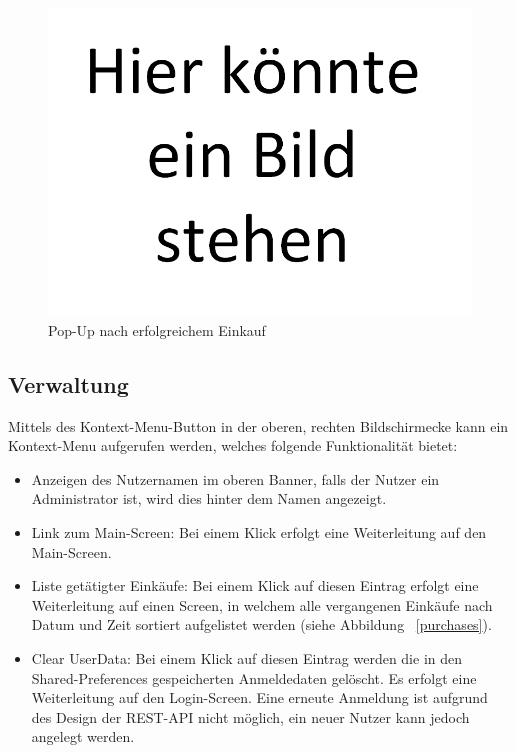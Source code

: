 \documentclass{scrartcl}
\begin{document}
	\begin{figure}[!h]
		\centering
		\includegraphics[scale=0.5]{./figures/placeholder.png}
		\caption{Pop-Up nach erfolgreichem Einkauf}
		\label{purchaseSuccess}
	\end{figure}

	\subsection{Verwaltung}\label{subsec:verwaltung}

	Mittels des Kontext-Menu-Button in der oberen, rechten Bildschirmecke kann ein Kontext-Menu aufgerufen werden, welches folgende Funktionalität bietet:

	\begin{itemize}
		\item Anzeigen des Nutzernamen im oberen Banner, falls der Nutzer ein Administrator ist, wird dies hinter dem Namen angezeigt.

		\item Link zum Main-Screen: Bei einem Klick erfolgt eine Weiterleitung auf den Main-Screen.

		\item Liste getätigter Einkäufe: Bei einem Klick auf diesen Eintrag erfolgt eine Weiterleitung auf einen Screen, in welchem alle vergangenen Einkäufe nach Datum und Zeit sortiert aufgelistet werden (siehe Abbildung ~\ref{purchases}).

		\item Clear UserData: Bei einem Klick auf diesen Eintrag werden die in den Shared-Preferences gespeicherten Anmeldedaten gelöscht.
		Es erfolgt eine Weiterleitung auf den Login-Screen.
		Eine erneute Anmeldung ist aufgrund des Design der REST-API nicht möglich, ein neuer Nutzer kann jedoch angelegt werden.
	\end{itemize}
\end{document}
